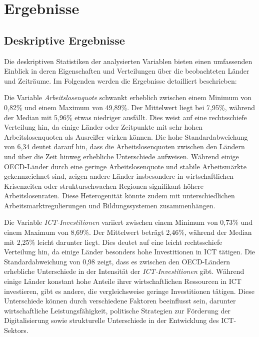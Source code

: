 
\section{Ergebnisse}


\subsection{Deskriptive Ergebnisse}

Die deskriptiven Statistiken der analysierten Variablen bieten einen umfassenden Einblick in 
deren Eigenschaften und Verteilungen über die beobachteten Länder und Zeiträume. Im Folgenden 
werden die Ergebnisse detailliert beschrieben: 



Die Variable \textit{Arbeitslosenquote} schwankt erheblich zwischen einem Minimum von 0,82\% und 
einem Maximum von 49,89\%. Der Mittelwert liegt bei 7,95\%, während der Median mit 5,96\% etwas 
niedriger ausfällt. Dies weist auf eine rechtsschiefe Verteilung hin, da einige Länder oder 
Zeitpunkte mit sehr hohen Arbeitslosenquoten als Ausreißer wirken können. Die hohe 
Standardabweichung von 6,34 deutet darauf hin, dass die Arbeitslosenquoten zwischen den Ländern 
und über die Zeit hinweg erhebliche Unterschiede aufweisen. Während einige \ac{OECD}-Länder durch 
eine geringe Arbeitslosenquote und stabile Arbeitsmärkte gekennzeichnet sind, zeigen andere 
Länder insbesondere in wirtschaftlichen Krisenzeiten oder strukturschwachen Regionen signifikant 
höhere Arbeitslosenraten. Diese Heterogenität könnte zudem mit unterschiedlichen 
Arbeitsmarktregulierungen und Bildungssystemen zusammenhängen. 

Die Variable \textit{\ac{ICT}-Investitionen} variiert zwischen einem Minimum von 0,73\% und einem 
Maximum von 8,69\%. Der Mittelwert beträgt 2,46\%, während der Median mit 2,25\% leicht darunter 
liegt. Dies deutet auf eine leicht rechtsschiefe Verteilung hin, da einige Länder besonders hohe 
Investitionen in \ac{ICT} tätigen. Die Standardabweichung von 0,98 zeigt, dass es zwischen den 
\ac{OECD}-Ländern erhebliche Unterschiede in der Intensität der \textit{\ac{ICT}-Investitionen} 
gibt. Während einige Länder konstant hohe Anteile ihrer wirtschaftlichen Ressourcen in \ac{ICT} 
investieren, gibt es andere, die vergleichsweise geringe Investitionen tätigen. Diese 
Unterschiede können durch verschiedene Faktoren beeinflusst sein, darunter wirtschaftliche 
Leistungsfähigkeit, politische Strategien zur Förderung der Digitalisierung sowie strukturelle 
Unterschiede in der Entwicklung des \ac{ICT}-Sektors. 

